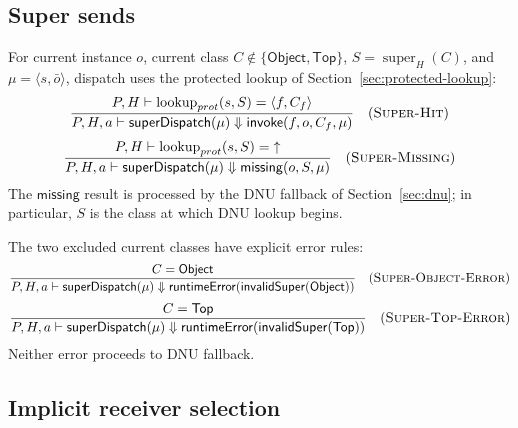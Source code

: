 \documentclass[11pt]{article}
\numberwithin{equation}{section}
\newcommand{\kw}[1]{\ensuremath{\mathsf{#1}}}
\newcommand{\undef}{\mathord{\uparrow}}
\newcommand{\Top}{\kw{Top}}
\newcommand{\Object}{\kw{Object}}
\newcommand{\super}{\mathop{\mathrm{super}}}
\newcommand{\lookup}{\mathop{\mathrm{lookup}}}
\newcommand{\rulelabel}[1]{\textsc{#1}}
\begin{document}
\subsection{Super sends}

For current instance $o$, current class $C\notin\{\Object,\Top\}$,
$S=\super_H(C)$, and $\mu=\langle s,\bar o\rangle$, dispatch uses the protected
lookup of Section~\ref{sec:protected-lookup}:
\[
\dfrac{P,H\vdash\lookup_{prot}(s,S)=\langle f,C_f\rangle}
      {P,H,a\vdash\mathsf{superDispatch}(\mu)
       \Downarrow\kw{invoke}(f,o,C_f,\mu)}
\quad(\rulelabel{Super-Hit})
\]
\[
\dfrac{P,H\vdash\lookup_{prot}(s,S)=\undef}
      {P,H,a\vdash\mathsf{superDispatch}(\mu)
       \Downarrow\kw{missing}(o,S,\mu)}
\quad(\rulelabel{Super-Missing})
\]
The $\kw{missing}$ result is processed by the DNU fallback of
Section~\ref{sec:dnu}; in particular, $S$ is the class at which DNU lookup
begins.

The two excluded current classes have explicit error rules:
\[
\dfrac{C=\Object}
      {P,H,a\vdash\mathsf{superDispatch}(\mu)
       \Downarrow\kw{runtimeError}(\kw{invalidSuper}(\Object))}
\quad(\rulelabel{Super-Object-Error})
\]
\[
\dfrac{C=\Top}
      {P,H,a\vdash\mathsf{superDispatch}(\mu)
       \Downarrow\kw{runtimeError}(\kw{invalidSuper}(\Top))}
\quad(\rulelabel{Super-Top-Error})
\]
Neither error proceeds to DNU fallback.

\subsection{Implicit receiver selection}
\label{sec:implicit}
\end{document}
